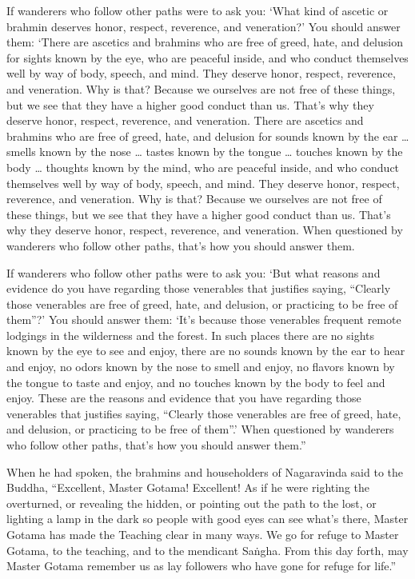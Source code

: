 \documentclass[12pt,openany]{book}%
\begin{document}
If wanderers who follow other paths were to ask you: ‘What kind of ascetic or brahmin deserves honor, respect, reverence, and veneration?’ You should answer them: ‘There are ascetics and brahmins who are free of greed, hate, and delusion for sights known by the eye, who are peaceful inside, and who conduct themselves well by way of body, speech, and mind. They deserve honor, respect, reverence, and veneration. Why is that? Because we ourselves are not free of these things, but we see that they have a higher good conduct than us. That’s why they deserve honor, respect, reverence, and veneration. There are ascetics and brahmins who are free of greed, hate, and delusion for sounds known by the ear … smells known by the nose … tastes known by the tongue … touches known by the body … thoughts known by the mind, who are peaceful inside, and who conduct themselves well by way of body, speech, and mind. They deserve honor, respect, reverence, and veneration. Why is that? Because we ourselves are not free of these things, but we see that they have a higher good conduct than us. That’s why they deserve honor, respect, reverence, and veneration. When questioned by wanderers who follow other paths, that’s how you should answer them. 

If wanderers who follow other paths were to ask you: ‘But what reasons and evidence do you have regarding those venerables that justifies saying, “Clearly those venerables are free of greed, hate, and delusion, or practicing to be free of them”?’ You should answer them: ‘It’s because those venerables frequent remote lodgings in the wilderness and the forest. In such places there are no sights known by the eye to see and enjoy, there are no sounds known by the ear to hear and enjoy, no odors known by the nose to smell and enjoy, no flavors known by the tongue to taste and enjoy, and no touches known by the body to feel and enjoy. These are the reasons and evidence that you have regarding those venerables that justifies saying, “Clearly those venerables are free of greed, hate, and delusion, or practicing to be free of them”.’ When questioned by wanderers who follow other paths, that’s how you should answer them.” 

When he had spoken, the brahmins and householders of Nagaravinda said to the Buddha, “Excellent, Master Gotama! Excellent! As if he were righting the overturned, or revealing the hidden, or pointing out the path to the lost, or lighting a lamp in the dark so people with good eyes can see what’s there, Master Gotama has made the Teaching clear in many ways. We go for refuge to Master Gotama, to the teaching, and to the mendicant \textsanskrit{Saṅgha}. From this day forth, may Master Gotama remember us as lay followers who have gone for refuge for life.” 
\end{document}
